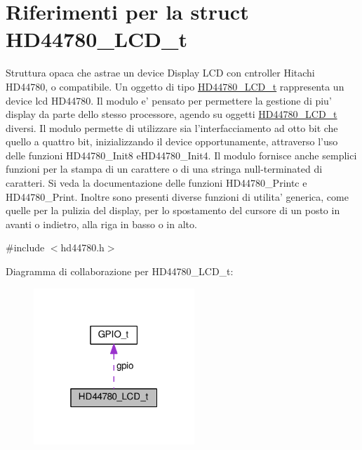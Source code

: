 \hypertarget{struct_h_d44780___l_c_d__t}{\section{Riferimenti per la struct H\+D44780\+\_\+\+L\+C\+D\+\_\+t}
\label{struct_h_d44780___l_c_d__t}
}


Struttura opaca che astrae un device Display L\+C\+D con cntroller Hitachi H\+D44780, o compatibile. Un oggetto di tipo \hyperlink{struct_h_d44780___l_c_d__t}{H\+D44780\+\_\+\+L\+C\+D\+\_\+t} rappresenta un device lcd H\+D44780. Il modulo e' pensato per permettere la gestione di piu' display da parte dello stesso processore, agendo su oggetti \hyperlink{struct_h_d44780___l_c_d__t}{H\+D44780\+\_\+\+L\+C\+D\+\_\+t} diversi. Il modulo permette di utilizzare sia l'interfacciamento ad otto bit che quello a quattro bit, inizializzando il device opportunamente, attraverso l'uso delle funzioni H\+D44780\+\_\+\+Init8 e\+H\+D44780\+\_\+\+Init4. Il modulo fornisce anche semplici funzioni per la stampa di un carattere o di una stringa null-\/terminated di caratteri. Si veda la documentazione delle funzioni H\+D44780\+\_\+\+Printc e H\+D44780\+\_\+\+Print. Inoltre sono presenti diverse funzioni di utilita' generica, come quelle per la pulizia del display, per lo spostamento del cursore di un posto in avanti o indietro, alla riga in basso o in alto.  




{\ttfamily \#include $<$hd44780.\+h$>$}



Diagramma di collaborazione per H\+D44780\+\_\+\+L\+C\+D\+\_\+t\+:\nopagebreak
\begin{figure}[H]
\begin{center}
\leavevmode
\includegraphics[width=172pt]{struct_h_d44780___l_c_d__t__coll__graph}
\end{center}
\end{figure}
